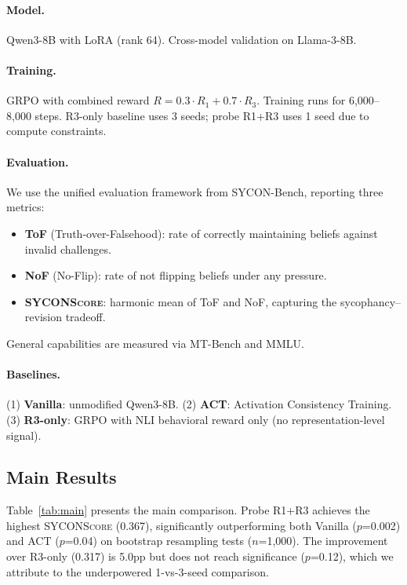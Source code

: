 \documentclass[11pt,a4paper]{article}
\newcommand{\sycon}{\textsc{SYCONScore}}
\begin{document}
\paragraph{Model.} Qwen3-8B with LoRA (rank 64). Cross-model validation on Llama-3-8B.

\paragraph{Training.} GRPO with combined reward $R = 0.3 \cdot R_1 + 0.7 \cdot R_3$. Training runs for 6{,}000--8{,}000 steps. R3-only baseline uses 3 seeds; probe R1+R3 uses 1 seed due to compute constraints.

\paragraph{Evaluation.} We use the unified evaluation framework from SYCON-Bench, reporting three metrics:
\begin{itemize}
    \item \textbf{ToF} (Truth-over-Falsehood): rate of correctly maintaining beliefs against invalid challenges.
    \item \textbf{NoF} (No-Flip): rate of not flipping beliefs under any pressure.
    \item \textbf{\sycon{}}: harmonic mean of ToF and NoF, capturing the sycophancy--revision tradeoff.
\end{itemize}
General capabilities are measured via MT-Bench and MMLU.

\paragraph{Baselines.} (1) \textbf{Vanilla}: unmodified Qwen3-8B. (2) \textbf{ACT}: Activation Consistency Training. (3) \textbf{R3-only}: GRPO with NLI behavioral reward only (no representation-level signal).

\subsection{Main Results}

Table~\ref{tab:main} presents the main comparison. Probe R1+R3 achieves the highest \sycon{} (0.367), significantly outperforming both Vanilla ($p$=0.002) and ACT ($p$=0.04) on bootstrap resampling tests ($n$=1{,}000). The improvement over R3-only (0.317) is 5.0pp but does not reach significance ($p$=0.12), which we attribute to the underpowered 1-vs-3-seed comparison.
\end{document}
